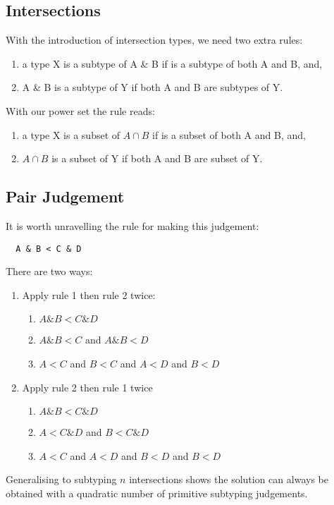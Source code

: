 \documentclass[oneside]{book}
\begin{document}
\subsection{Intersections}
With the introduction of intersection types, we need two extra rules: 
\begin{enumerate}
\item a type X is a subtype of A \& B if is a subtype of both A and B, and, 
\item A \& B is a subtype of Y if both A and B are subtypes of Y.
\end{enumerate}

With our power set the rule reads: 
\begin{enumerate}
\item a type X is a subset of $A \cap B$ if is a subset of both A and B, and, 
\item $A \cap B$ is a subset of Y if both A and B are subset of Y.
\end{enumerate}

\subsection{Pair Judgement}
It is worth unravelling the rule for making this judgement:
\begin{verbatim}
  A & B < C & D
\end{verbatim}
There are two ways:
\begin{enumerate}
\item Apply rule 1 then rule 2 twice:
\begin{enumerate}
  \item $A \& B < C \& D $
  \item $A \& B < C$ and $A \& B < D$
  \item $A < C$ and $B < C$ and $A < D$ and $B < D$
\end{enumerate}
\item Apply rule 2 then rule 1 twice
\begin{enumerate}
  \item $A \& B < C \& D$
  \item $A < C \& D$ and $B < C \& D$
  \item $A < C$ and $A < D$ and $B < D$ and $B < D$
\end{enumerate}
\end{enumerate}

Generalising to subtyping $n$ intersections shows the solution can
always be obtained with a quadratic number of primitive subtyping
judgements.
\end{document}
